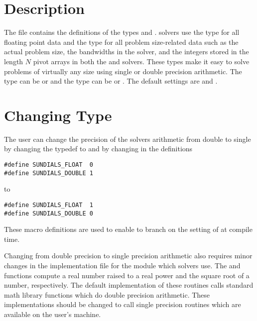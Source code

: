 %
\section{Description}

The  file contains the definitions of the types  and
. {\sundials} solvers use the type  for all floating point data and
the type  for all problem size-related data such as the actual
problem size, the bandwidths in the {\band} solver, and the integers
stored in the length $N$ pivot arrays in both the {\dense} and {\band} solvers.
These types make it easy to solve problems of virtually any size
using single or double precision arithmetic. The type  can be
 or  and the type  can be  or
. The default settings are  and .

\section{Changing Type }

The user can change the precision of the {\sundials} solvers arithmetic from double to single
by changing the typedef  to 
and by changing in  the definitions
\begin{verbatim}
#define SUNDIALS_FLOAT  0
#define SUNDIALS_DOUBLE 1
\end{verbatim}
to
\begin{verbatim}
#define SUNDIALS_FLOAT  1
#define SUNDIALS_DOUBLE 0
\end{verbatim}
These macro definitions are used to enable  to branch on
the setting of  at compile time. 

Changing from double precision to single precision arithmetic also
requires minor changes in the implementation file  for
the {\sundialsmath} module which {\sundials} solvers use. The  and
 functions compute a real number raised to a real power and the
square root of a number, respectively. The default implementation of
these routines calls standard {\C} math library functions which do double
precision arithmetic. These implementations should be changed to call
single precision routines which are available on the user's machine.

